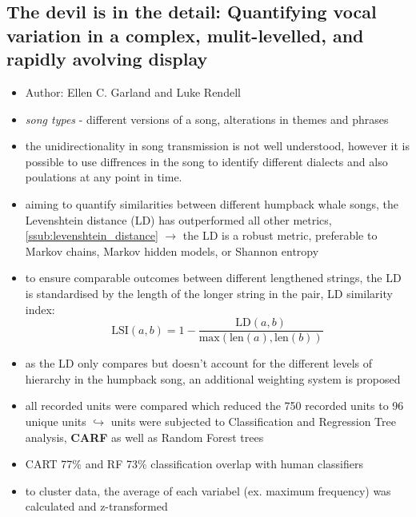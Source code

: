 \documentclass[12pt,a4paper]{article}
\begin{document}
\newpage
\subsection{The devil is in the detail: Quantifying vocal variation in a complex, mulit-levelled, and rapidly avolving display} %
\label{sub:the_devil_is_in_the_detail_quantifying_vocal_variation_in_a_complex_mulit_levelled_and_rapidly_avolving_display}

\begin{itemize}
  \item Author: Ellen C. Garland and Luke Rendell \cite{garland_devil_2017}
  \item \textit{song types} - different versions of a song, alterations in themes and phrases
  \item the unidirectionality in song transmission is not well understood, however it is possible to use diffrences in the song to identify different dialects and also poulations at any point in time.
  \item aiming to quantify similarities between different humpback whale songs, the Levenshtein distance (LD) has outperformed all other metrics, \ref{ssub:levenshtein_distance}
  \newline \indent $\longrightarrow$ the LD is a robust metric, preferable to Markov chains, Markov hidden models, or Shannon entropy
  \item to ensure comparable outcomes between different lengthened strings, the LD is standardised by the length of the longer string in the pair, LD similarity index:
  \begin{equation}
    \text{LSI}(a, b) = 1- \frac{\text{LD}(a, b)}{\text{max}(\text{len}(a), \text{len}(b))}
  \end{equation}
  \item as the LD only compares but doesn't account for the different levels of hierarchy in the humpback song, an additional weighting system is proposed
  \item all recorded units were compared which reduced the 750 recorded units to 96 unique units
  \newline \indent $\hookrightarrow$ units were subjected to Classification and Regression Tree analysis, \textbf{CARF} as well as Random Forest trees
   \item CART 77\% and RF 73\% classification overlap with human classifiers
   \item to cluster data, the average of each variabel (ex. maximum frequency) was calculated and z-transformed

\end{itemize}
\end{document}
